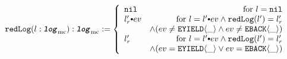\begin{figure}
\noindent{}
$$
\mcreducelogfunckwd (l : \mclog) : \mclog := 
 \left\{\begin{array}{lr}
\nulllist & \text{for } l = \nulllist \\
\listconsoppo{ev}{l_r'} & \text{for } l = \listconsoppo{ev}{l'} \wedge \mcreducelogfunc{l'}{l_r'}\\
&\wedge(ev \neq \yieldev{\_} \wedge ev \neq \yieldbackev{\_})\\
l_r' & \text{for } l = \listconsoppo{ev}{l'} \wedge \mcreducelogfunc{l'}{l_r'}\\
&\wedge (ev = \yieldev{\_} \vee ev = \yieldbackev{\_})\\
\end{array} \right.
$$




\end{figure}
